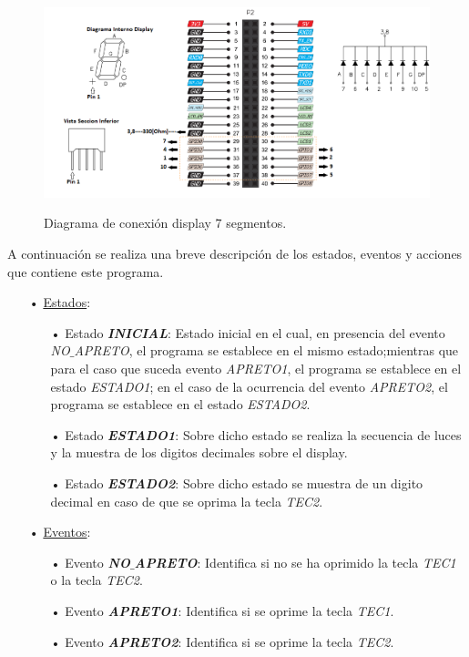 \documentclass[12pt,letterpaper]{article}
\begin{document}
\begin{center}
\begin{figure}[!h]
\centering
\includegraphics[width=10 cm]{figuras/f5.png}\\
\caption{Diagrama de conexión display 7 segmentos.}
\label{Fig23}
\end{figure}
\end{center}

A continuación se realiza una breve descripción de los estados, eventos y acciones que contiene este programa.
\begin{enumerate}
\item[•]\underline{Estados}:
\begin{enumerate}
\item[•]Estado \textit{\textbf{INICIAL}}: Estado inicial en el cual, en presencia del evento \textit{NO$\_$APRETO}, el programa se establece en el mismo estado;mientras que para el caso que suceda evento \textit{APRETO1}, el programa se establece en el estado \textit{ESTADO1}; en el caso de la ocurrencia del evento \textit{APRETO2}, el programa se establece en el estado \textit{ESTADO2}. 
\item[•]Estado \textit{\textbf{ESTADO1}}: Sobre dicho estado se realiza la secuencia de luces y la muestra de los digitos decimales sobre el display.
\item[•]Estado \textit{\textbf{ESTADO2}}: Sobre dicho estado se muestra de un digito decimal en caso de que se oprima la tecla \textit{TEC2}.
\end{enumerate}
\item[•]\underline{Eventos}:
\begin{enumerate}
\item[•]Evento \textit{\textbf{NO$\_$APRETO}}: Identifica si no se ha oprimido la tecla \textit{TEC1} o la tecla \textit{TEC2}.
\item[•]Evento \textit{\textbf{APRETO1}}: Identifica si se oprime la tecla \textit{TEC1}.
\item[•]Evento \textit{\textbf{APRETO2}}: Identifica si se oprime la tecla \textit{TEC2}.
\end{enumerate}
\end{enumerate}
\end{document}
